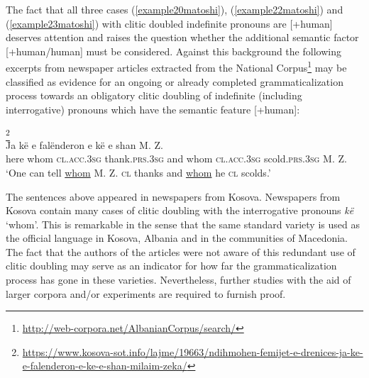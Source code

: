 \documentclass[output=paper]{langsci/langscibook}
\begin{document}
The fact that all three cases (\ref{example20matoshi}), (\ref{example22matoshi}) and (\ref{example23matoshi}) with clitic doubled indefinite pronouns are [+human] deserves attention and raises the question whether the additional semantic factor [+human\slash\textminus{}human] must be considered. Against this background the following excerpts from newspaper articles extracted from the  National Corpus\footnote{\url{http://web-corpora.net/AlbanianCorpus/search/}}  may be classified as evidence for an ongoing or already completed grammaticalization process towards an obligatory clitic doubling of indefinite (including interrogative) pronouns which have the semantic feature [+human]:

\ea \label{example25matoshi} 
	\footnote{\url{https://www.kosova-sot.info/lajme/19663/ndihmohen-femijet-e-drenices-ja-ke-e-falenderon-e-ke-e-shan-milaim-zeka/}}\\
	\gll Ja kë e falënderon e kë e shan M. Z.\\
	here whom \textsc{cl.acc.3sg} thank.\textsc{prs.3sg} and whom \textsc{cl.acc.3sg} scold.\textsc{prs.3sg} M. Z.\\	
	\glt ‘One can tell \uline{whom} M. Z. \textsc{cl} thanks and \uline{whom} he \textsc{cl} scolds.’
 \z
 
The sentences above appeared in newspapers from Kosova. Newspapers from Kosova contain many cases of clitic doubling with the interrogative pronouns \textit{kë} `whom'. This is remarkable in the sense that the same standard variety is used as the official language in Kosova, Albania and in the  communities of Macedonia. The fact that the authors of the articles were not aware of this redundant use of clitic doubling may serve as an indicator for how far the grammaticalization process has gone in these varieties. Nevertheless, further studies with the aid of larger corpora and/or experiments are required to furnish proof.  
 
\end{document}
